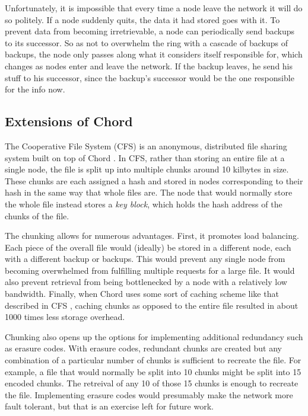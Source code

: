 \documentclass[conference, compsocconf, letterpaper]{IEEEtran}
\begin{document}
Unfortunately, it is impossible that every time a node leave the network it will do so politely.  If a node suddenly quits, the data it had stored goes with it. To prevent data from becoming irretrievable, a node can periodically send backups to its successor.  So as not to overwhelm the ring with a cascade of backups of backups, the node only passes along what it considers itself responsible for, which changes as nodes enter and leave the network.  If the backup leaves, he send his stuff to his successor, since the backup's successor would be the one responsible for the info now. 


\subsection{Extensions of Chord}


The Cooperative File System (CFS) is an anonymous, distributed file sharing system built on top of Chord \cite{CFS}.  In CFS, rather than storing an entire file at a single node, the file is split up into multiple chunks around 10 kilbytes in size.  These chunks are each assigned a hash and stored in nodes corresponding to their hash in the same way that whole files are.  The node that would normally store the whole file instead stores a \emph{key block}, which holds the hash address of the chunks of the file. 

The chunking allows for numerous advantages.  First, it promotes load balancing. Each piece of the overall file would (ideally) be stored in a different node, each with a different backup or backups.  This would prevent any single node from becoming overwhelmed from fulfilling multiple requests for a large file.  It would also prevent retrieval from being bottlenecked by a node with a relatively low bandwidth. Finally, when Chord uses some sort of caching scheme like that described in CFS \cite{CFS}, caching chunks as opposed to the entire file resulted in about 1000 times less storage overhead.  


Chunking also opens up the options for implementing additional redundancy such as erasure codes\cite{rizzo1997effective}. With erasure codes, redundant chunks are created but any combination of a particular number of chunks is sufficient to recreate the file.  For example, a file that would normally be split into 10 chunks might be split into 15 encoded chunks.  The retreival of any 10 of those 15 chunks is enough to recreate the file.  Implementing erasure codes would presumably make the network more fault tolerant, but that is an exercise left for future work.
\end{document}
